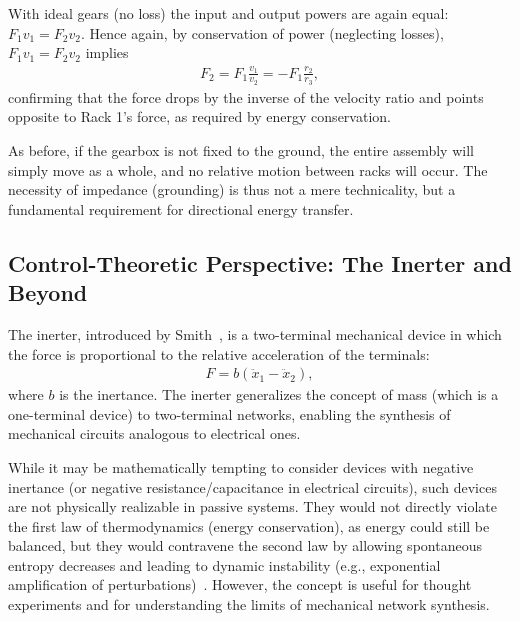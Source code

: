 \documentclass[reprint,aps,pra,superscriptaddress,longbibliography]{revtex4-2}
\begin{document}
With ideal gears (no loss) the input and output powers are again equal: $F_1 v_1 = F_2 v_2$. Hence
again, by conservation of power (neglecting losses), $F_1 v_1 = F_2 v_2$ implies
\begin{align}
     F_2 = F_1 \frac{v_1}{v_2} = - F_1 \frac{r_2}{r_3},
\end{align}
confirming that the force drops by the inverse of the velocity ratio and points opposite to Rack 1's force, as required by energy conservation.

As before, if the gearbox is not fixed to the ground, the entire assembly will simply move as a whole, and no relative motion between racks will occur. The necessity of impedance (grounding) is thus not a mere technicality, but a fundamental requirement for directional energy transfer.

\subsection{Control-Theoretic Perspective: The Inerter and Beyond}

The inerter, introduced by Smith~\cite{Smith2002}, is a two-terminal mechanical device in which the force is proportional to the relative acceleration of the terminals:
\begin{align}
    F = b (\ddot{x}_1 - \ddot{x}_2),
\end{align}
where $b$ is the inertance. The inerter generalizes the concept of mass (which is a one-terminal device) to two-terminal networks, enabling the synthesis of mechanical circuits analogous to electrical ones.


While it may be mathematically tempting to consider devices with negative inertance (or negative resistance/capacitance in electrical circuits), such devices are not physically realizable in passive systems. They would not directly violate the first law of thermodynamics (energy conservation), as energy could still be balanced, but they would contravene the second law by allowing spontaneous entropy decreases and leading to dynamic instability (e.g., exponential amplification of perturbations)~\cite{callen-1951,Smith2002}. However, the concept is useful for thought experiments and for understanding the limits of mechanical network synthesis.
\end{document}
